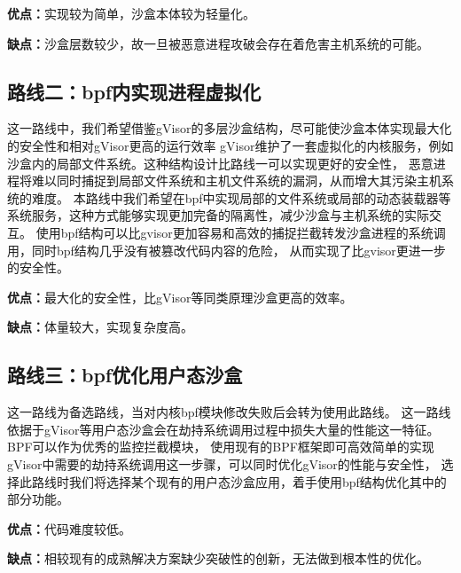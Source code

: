 \documentclass[AutoFakeBold,a4paper]{ctexart}
\begin{document}
\textbf{优点：}实现较为简单，沙盒本体较为轻量化。

\textbf{缺点：}沙盒层数较少，故一旦被恶意进程攻破会存在着危害主机系统的可能。

\subsection{路线二：bpf内实现进程虚拟化}\label{路线二}
这一路线中，我们希望借鉴gVisor的多层沙盒结构，尽可能使沙盒本体实现最大化的安全性和相对gVisor更高的运行效率
gVisor维护了一套虚拟化的内核服务，例如沙盒内的局部文件系统。这种结构设计比路线一可以实现更好的安全性，
恶意进程将难以同时捕捉到局部文件系统和主机文件系统的漏洞，从而增大其污染主机系统的难度。
本路线中我们希望在bpf中实现局部的文件系统或局部的动态装载器等系统服务，这种方式能够实现更加完备的隔离性，减少沙盒与主机系统的实际交互。
使用bpf结构可以比gvisor更加容易和高效的捕捉拦截转发沙盒进程的系统调用，同时bpf结构几乎没有被篡改代码内容的危险，
从而实现了比gvisor更进一步的安全性。

\textbf{优点：}最大化的安全性，比gVisor等同类原理沙盒更高的效率。

\textbf{缺点：}体量较大，实现复杂度高。

\subsection{路线三：bpf优化用户态沙盒}\label{路线三}
这一路线为备选路线，当对内核bpf模块修改失败后会转为使用此路线。
这一路线依据于gVisor等用户态沙盒会在劫持系统调用过程中损失大量的性能这一特征。BPF可以作为优秀的监控拦截模块，
使用现有的BPF框架即可高效简单的实现gVisor中需要的劫持系统调用这一步骤，可以同时优化gVisor的性能与安全性，
选择此路线时我们将选择某个现有的用户态沙盒应用，着手使用bpf结构优化其中的部分功能。

\textbf{优点：}代码难度较低。

\textbf{缺点：}相较现有的成熟解决方案缺少突破性的创新，无法做到根本性的优化。









% 
\end{document}
